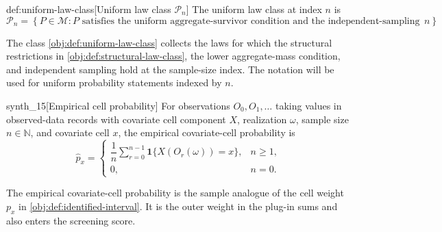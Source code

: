 \begin{definitionv}{def:uniform-law-class}[Uniform law class \(\mathcal P_n\)]
The uniform law class at index \(n\) is
\[
\mathcal P_n
=
\left\{
P\in\mathcal M:
P \text{ satisfies the uniform aggregate-survivor condition and the independent-sampling condition at index } n
\right\}.
\]
\end{definitionv}

The class \cref{obj:def:uniform-law-class} collects the laws for which the structural restrictions in \cref{obj:def:structural-law-class}, the lower aggregate-mass condition, and independent sampling hold at the sample-size index.  The notation  will be used for uniform probability statements indexed by \(n\).

\begin{definitionv}{synth_15}[Empirical cell probability]
For observations \(O_0,O_1,\ldots\) taking values in observed-data records with covariate cell component \(X\), realization \(\omega\), sample size \(n\in\mathbb N\), and covariate cell \(x\), the empirical covariate-cell probability is
\[
\widehat p_x
=
\begin{cases}
\dfrac{1}{n}\sum_{r=0}^{n-1}\mathbf 1\{X(O_r(\omega))=x\}, & n\ge 1,\\
0, & n=0.
\end{cases}
\]
\end{definitionv}

The empirical covariate-cell probability  is the sample analogue of the cell weight \(p_x\) in \cref{obj:def:identified-interval}.  It is the outer weight in the plug-in sums and also enters the screening score.

